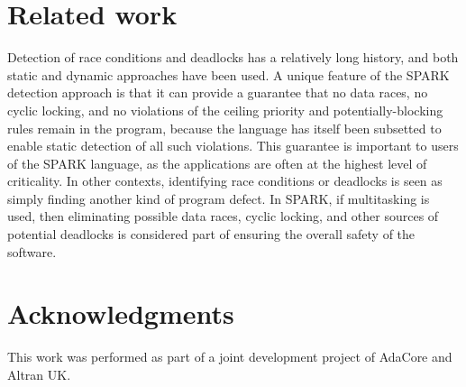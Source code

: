 \documentclass[conference,compsoc]{IEEEtran}
\begin{document}
\section{Related work}
Detection of race conditions and deadlocks has a relatively long history,
and both static \cite{engler2003racerx} and dynamic \cite{yu2005racetrack}
approaches have been used. A unique feature of the SPARK detection approach
is that it can provide a guarantee that no data races, no cyclic locking,
and no violations of the ceiling priority and potentially-blocking rules
remain in the program, because the language has itself been subsetted to
enable static detection of all such violations. This guarantee is important
to users of the SPARK language, as the applications are often at the
highest level of criticality. In other contexts, identifying race
conditions or deadlocks is seen as simply finding another kind of program
defect. In SPARK, if multitasking is used, then eliminating possible data
races, cyclic locking, and other sources of potential deadlocks is
considered part of ensuring the overall safety of the software.


\section*{Acknowledgments}
This work was performed as part of a joint development project of AdaCore
and Altran UK.



\end{document}
